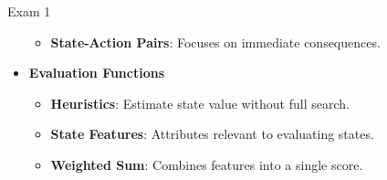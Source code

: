 \begin{examnotes}{Exam 1}
\begin{highlight}
\begin{itemize}
\begin{itemize}
                    \item \textbf{State-Action Pairs}: Focuses on immediate consequences.
                \end{itemize}
            \item \textbf{Evaluation Functions}
                \begin{itemize}
                    \item \textbf{Heuristics}: Estimate state value without full search.
                    \item \textbf{State Features}: Attributes relevant to evaluating states.
                    \item \textbf{Weighted Sum}: Combines features into a single score.
                \end{itemize}
        \end{itemize}
    \end{highlight}
\end{examnotes}

